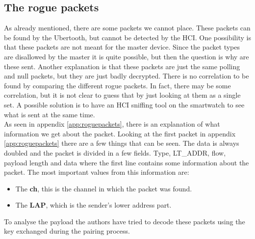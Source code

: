 \subsection{The rogue packets}
As already mentioned, there are some packets we cannot place. These packets can be found by the Ubertooth, but cannot be detected by the HCI. One possibility is that these packets are not meant for the master device. Since the packet types are disallowed by the master it is quite possible, but then the question is why are these sent. Another explanation is that these packets are just the same polling and null packets, but they are just badly decrypted.
There is no correlation to be found by comparing the different rogue packets. In fact, there may be some correlation, but it is not clear to guess that by just looking at them as a single set. A possible solution is to have an HCI sniffing tool on the smartwatch to see what is sent at the same time. \\
As seen in appendix \ref{app:roguepackets}, there is an explanation of what information we get about the packet.
Looking at the first packet in appendix \ref{app:roguepackets} there are a few things that can be seen. The data is always doubled and the packet is divided in a few fields. Type, LT\_ADDR, flow, payload length and data where the first line contains some information about the packet. The most important values from this information are:
\begin{itemize} 
\item The \textbf{ch}, this is the channel in which the packet was found.
\item The \textbf{LAP}, which is the sender's lower address part.
\end{itemize}

To analyse the payload the authors have tried to decode these packets using the key exchanged during the pairing process.
